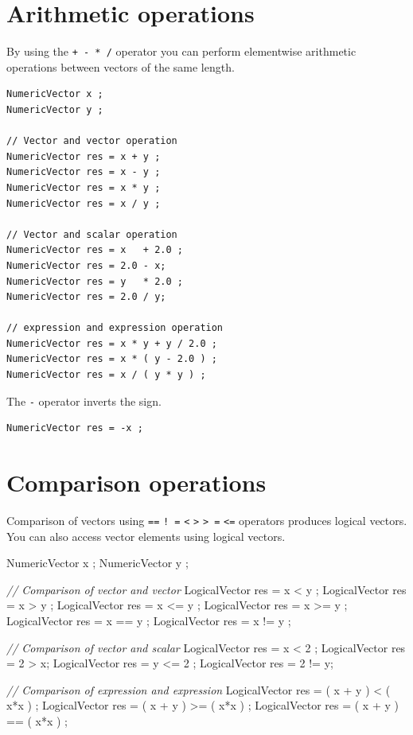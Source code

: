 \documentclass[]{book}
\newenvironment{Shaded}{\begin{snugshade}}{\end{snugshade}}
\newcommand{\CommentTok}[1]{\textcolor[rgb]{0.56,0.35,0.01}{\textit{#1}}}
\newcommand{\DecValTok}[1]{\textcolor[rgb]{0.00,0.00,0.81}{#1}}
\newcommand{\NormalTok}[1]{#1}
\begin{document}
\hypertarget{arithmetic-operations}{%
\section{Arithmetic operations}\label{arithmetic-operations}}

By using the \texttt{+\ -\ *\ /} operator you can perform elementwise arithmetic operations between vectors of the same length.

\begin{verbatim}
NumericVector x ;
NumericVector y ;

// Vector and vector operation
NumericVector res = x + y ;
NumericVector res = x - y ;
NumericVector res = x * y ;
NumericVector res = x / y ;

// Vector and scalar operation
NumericVector res = x   + 2.0 ;
NumericVector res = 2.0 - x;
NumericVector res = y   * 2.0 ;
NumericVector res = 2.0 / y;

// expression and expression operation
NumericVector res = x * y + y / 2.0 ;
NumericVector res = x * ( y - 2.0 ) ;
NumericVector res = x / ( y * y ) ;
\end{verbatim}

The \texttt{-} operator inverts the sign.

\begin{verbatim}
NumericVector res = -x ;
\end{verbatim}

\hypertarget{comparison-operations}{%
\section{Comparison operations}\label{comparison-operations}}

Comparison of vectors using \texttt{==} \texttt{!\ =} \texttt{\textless{}} \texttt{\textgreater{}} \texttt{\textgreater{}\ =} \texttt{\textless{}=} operators produces logical vectors. You can also access vector elements using logical vectors.

\begin{Shaded}
\begin{Highlighting}[]
\NormalTok{NumericVector x ;}
\NormalTok{NumericVector y ;}

\CommentTok{// Comparison of vector and vector}
\NormalTok{LogicalVector res = x < y ;}
\NormalTok{LogicalVector res = x > y ;}
\NormalTok{LogicalVector res = x <= y ;}
\NormalTok{LogicalVector res = x >= y ;}
\NormalTok{LogicalVector res = x == y ;}
\NormalTok{LogicalVector res = x != y ;}

\CommentTok{// Comparison of vector and scalar}
\NormalTok{LogicalVector res = x < }\DecValTok{2}\NormalTok{ ;}
\NormalTok{LogicalVector res = }\DecValTok{2}\NormalTok{ > x;}
\NormalTok{LogicalVector res = y <= }\DecValTok{2}\NormalTok{ ;}
\NormalTok{LogicalVector res = }\DecValTok{2}\NormalTok{ != y;}

\CommentTok{// Comparison of expression and expression}
\NormalTok{LogicalVector res = ( x + y ) < ( x*x ) ;}
\NormalTok{LogicalVector res = ( x + y ) >= ( x*x ) ;}
\NormalTok{LogicalVector res = ( x + y ) == ( x*x ) ;}
\end{Highlighting}
\end{Shaded}
\end{document}
